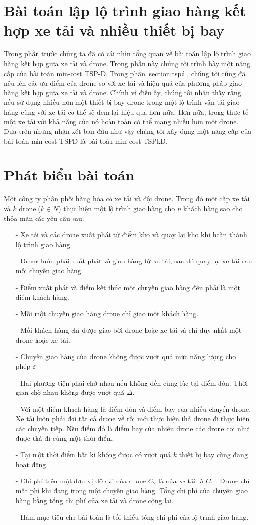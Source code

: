 \documentclass[a4paper,12pt]{report}
\begin{document}
\section{Bài toán lập lộ trình giao hàng kết hợp xe tải và nhiều thiết bị bay}
\label{section:intspkd}
Trong phần trước chúng ta đã có cái nhìn tổng quan về bài toán lập lộ trình giao hàng kết hợp giữa xe tải và drone. Trong phần  này chúng tôi trình bày một nâng cấp của bài toán min-cost TSP-D. Trong phần \ref{section:tspd}, chúng tôi cũng đã nêu lên các ưu điểm của drone so với xe tải và hiệu quả của phương pháp giao hàng kết hợp giữa xe tải và drone. Chính vì điều ấy, chúng tôi nhận thấy rằng nếu sử dụng nhiều hơn một thiết bị bay drone trong một lộ trình vận tải giao hàng cùng với xe tải có thể sẽ đem lại hiệu quả hơn nữa. Hơn nữa, trong thực tế một xe tải với khả năng của nó hoàn toàn có thể mang nhiều hơn một drone. Dựa trên những nhận xét ban đầu như vậy chúng tôi xây dựng một nâng cấp của bài toán min-cost TSPD là bài toán min-cost TSPkD.
\section{Phát biểu bài toán}
\label{section:pbtspkd}
Một công ty phân phối hàng hóa có xe tải và đội drone. Trong đó một cặp xe tải và $k$ drone ($k \in N$) thực hiện một lộ trình giao hàng cho $n$ khách hàng sao cho thỏa mãn các yêu cầu sau.
\begin{itemize}
\item[-] Xe tải và các drone xuất phát từ điểm kho và quay lại kho khi hoàn thành lộ trình giao hàng.
\item[-] Drone luôn phải xuất phát và giao hàng từ xe tải, sau đó quay lại xe tải sau mỗi chuyến giao hàng.
\item[-] Điểm xuất phát và điểm kết thúc một chuyến giao hàng đều phải là một điểm khách hàng.
\item[-] Mỗi một chuyến giao hàng drone chỉ giao một khách hàng.
\item[-] Mối khách hàng chỉ được giao bời drone hoặc xe tải và chỉ duy nhất một drone hoặc xe tải.
\item[-] Chuyến giao hàng của drone không được vượt quá mức năng lượng cho phép $\varepsilon$ 
\item[-] Hai phương tiện phải chờ nhau nếu không đến cùng lúc tại điểm đón. Thời gian chờ nhau không được vượt quá $\Delta$.
\item[-] Với một điểm khách hàng là điểm đón và điểm bay của nhiều chuyến drone. Xe tải luôn phải đợi tất cả drone về rồi mới thực hiện thả drone đi thực hiện các chuyến tiếp. Nếu điểm đó là điểm bay của nhiều drone các drone coi như được thả đi cùng một thời điểm.
\item[-] Tại một thời điểm bất kì không được có vượt quá $k$ thiết bị bay cùng đang hoạt động.
\item[-] Chi phí trên một đơn vị độ dài của drone $C_2$ là của xe tải là $C_1$ . Drone chỉ mất phí khi đang trong một chuyến giao hàng. Tổng chi phí của chuyền giao hàng bằng tổng chi phí của xe tải và drone cộng lại.
\item[-] Hàm mục tiêu cho bài toán là tối thiểu tổng chi phí của lộ trình giao hàng.
\end{itemize}
\end{document}

